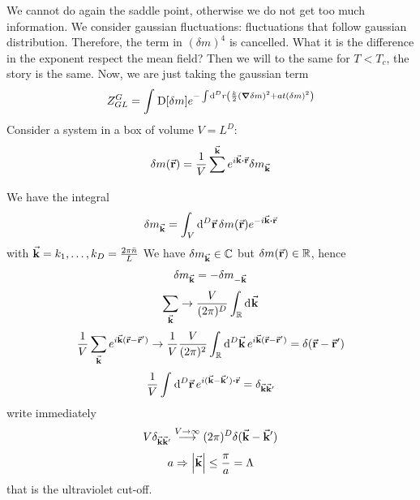 \documentclass[../main/main.tex]{subfiles}
\begin{document}
We cannot do again the saddle point, otherwise we do not get too much information.
We consider gaussian fluctuations: fluctuations that follow gaussian distribution.
Therefore, the term in \( (\delta m)^4 \)  is cancelled.
What it is the difference in the exponent respect the mean field?
Then we will to the same for \( T < T_c \), the story is the same. Now, we are just taking the gaussian term
\begin{equation}
  Z_{GL}^G = \int_{}^{} \text{D} \qty[\delta m] e^{- \int_{}^{} \dd[D]{r} \qty(\frac{k}{2} \qty(\grad \delta m)^2 + a t (\delta m)^2  )  }
 \end{equation}
Consider a system in a box of volume \( V = L^D \):
\begin{equation}
  \delta m (\va{r}) = \frac{1}{V} \sum_{}^{\va{k}}  e^{i \va{k}\vdot \va{r}} \delta m_{\va{k}}
\end{equation}
We have the integral
\begin{equation}
  \delta m_{\va{k}} = \int_{V}^{} \dd[D]{\va{r}} \delta m (\va{r}) e^{-i \va{k} \vdot \va{r} }
\end{equation}
with \( \va{k} = k_1, \dots, k_D = \frac{2 \pi  \bar{n} }{L}\)
We have \( \delta m_{\va{k}} \in \mathbb{C} \) but \( \delta m (\va{r}) \in \mathbb{R} \), hence
\begin{equation}
  \delta m_{\va{k}} = - \delta m_{-\va{k}}
\end{equation}
\begin{equation}
  \sum_{\va{k}}^{} \rightarrow \frac{V}{( 2 \pi )^D} \int_{\mathbb{R}}^{} \dd[]{\va{k}}
\end{equation}
\begin{equation}
  \frac{1}{V} \sum_{\va{k}}^{} e^{i \va{k} (\va{r}-\va{r}')} \rightarrow \frac{1}{V} \frac{V}{(2 \pi )^2} \int_{\mathbb{R}}^{} \dd[D]{\va{k}} e^{i \va{k} (\va{r}-\va{r}')}
  = \delta (\va{r}- \va{r}')
\end{equation}
\begin{equation}
  \frac{1}{V} \int_{}^{} \dd[D]{\va{r}} e^{i (\va{k} - \va{k}') \vdot  \va{r}} = \delta _{\va{k}\va{k}'}
\end{equation}
write immediately
\begin{equation}
  V \delta _{\va{k} \va{k}'} \overset{V \rightarrow \infty }{\longrightarrow  } (2 \pi )^D \delta (\va{k} - \va{k}')
\end{equation}
\begin{equation}
  a \Rightarrow \abs{\va{k}} \le \frac{\pi }{a} = \Lambda
\end{equation}
that is the ultraviolet cut-off.
\end{document}
